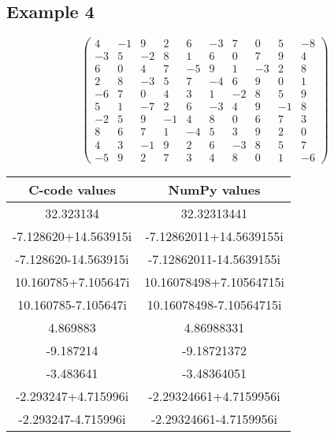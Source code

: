 \documentclass[a4paper, 14pt]{article}
\begin{document}
\subsection*{Example 4}
\[
\begin{pmatrix}
4 & -1 & 9 & 2 & 6 & -3 & 7 & 0 & 5 & -8 \\
-3 & 5 & -2 & 8 & 1 & 6 & 0 & 7 & 9 & 4 \\
6 & 0 & 4 & 7 & -5 & 9 & 1 & -3 & 2 & 8 \\
2 & 8 & -3 & 5 & 7 & -4 & 6 & 9 & 0 & 1 \\
-6 & 7 & 0 & 4 & 3 & 1 & -2 & 8 & 5 & 9 \\
5 & 1 & -7 & 2 & 6 & -3 & 4 & 9 & -1 & 8 \\
-2 & 5 & 9 & -1 & 4 & 8 & 0 & 6 & 7 & 3 \\
8 & 6 & 7 & 1 & -4 & 5 & 3 & 9 & 2 & 0 \\
4 & 3 & -1 & 9 & 2 & 6 & -3 & 8 & 5 & 7 \\
-5 & 9 & 2 & 7 & 3 & 4 & 8 & 0 & 1 & -6
\end{pmatrix}
\]
\par
\vspace{1em}
\begin{tabular}{|c|c|}
\hline
\textbf{C-code values}       & \textbf{NumPy values}          \\ \hline
32.323134                   & 32.32313441                    \\ 
-7.128620+14.563915i        & -7.12862011+14.5639155i        \\ 
-7.128620-14.563915i        & -7.12862011-14.5639155i        \\ 
10.160785+7.105647i         & 10.16078498+7.10564715i        \\ 
10.160785-7.105647i         & 10.16078498-7.10564715i        \\ 
4.869883                    & 4.86988331                     \\ 
-9.187214                   & -9.18721372                    \\ 
-3.483641                   & -3.48364051                    \\ 
-2.293247+4.715996i         & -2.29324661+4.7159956i         \\ 
-2.293247-4.715996i         & -2.29324661-4.7159956i         \\ \hline
\end{tabular}
\end{document}
